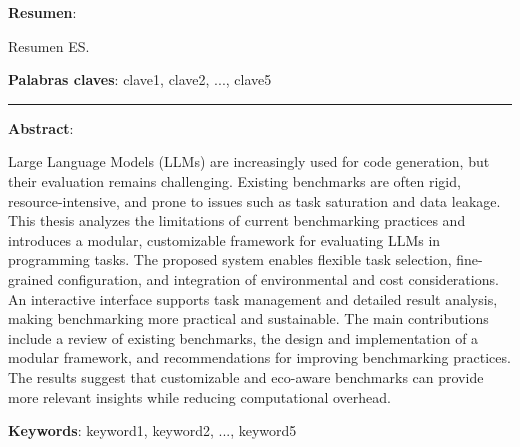 \textbf{Resumen}:

Resumen ES.

\textbf{Palabras claves}: clave1, clave2, ..., clave5

\vspace{1cm}
\begin{center}
  \rule{0.5\textwidth}{.4pt}
\end{center}
\vspace{1cm}

\textbf{Abstract}:

Large Language Models (LLMs) are increasingly used for code generation, but their evaluation remains challenging.
Existing benchmarks are often rigid, resource-intensive, and prone to issues such as task saturation and data leakage.
This thesis analyzes the limitations of current benchmarking practices and introduces a modular, customizable framework for evaluating LLMs in programming tasks.
The proposed system enables flexible task selection, fine-grained configuration, and integration of environmental and cost considerations.
An interactive interface supports task management and detailed result analysis, making benchmarking more practical and sustainable.
The main contributions include a review of existing benchmarks, the design and implementation of a modular framework, and recommendations for improving benchmarking practices.
The results suggest that customizable and eco-aware benchmarks can provide more relevant insights while reducing computational overhead.


\textbf{Keywords}: keyword1, keyword2, ..., keyword5
